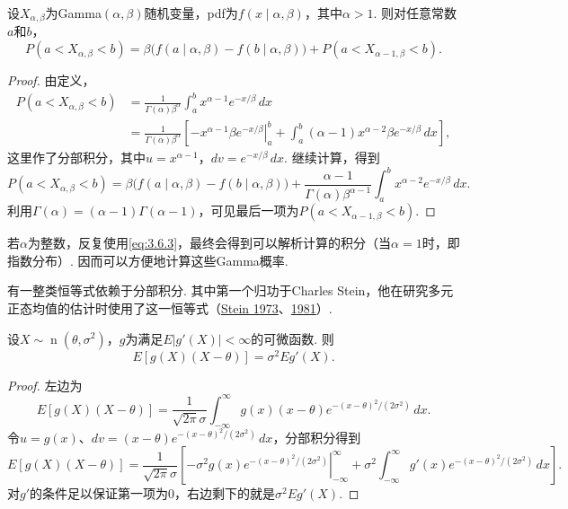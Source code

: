 \begin{theorem}\label{thm:3.6.4}
设$X_{\alpha,\beta}$为Gamma$(\alpha,\beta)$随机变量，pdf为$f(x\mid\alpha,\beta)$，其中$\alpha>1$. 则对任意常数$a$和$b$，
\begin{equation}\label{eq:3.6.3}
P(a<X_{\alpha,\beta}<b)=\beta\bigl(f(a\mid\alpha,\beta)-f(b\mid\alpha,\beta)\bigr)+P(a<X_{\alpha-1,\beta}<b).
\end{equation}
\end{theorem}
\begin{proof}
由定义，
\begin{align*}
P(a<X_{\alpha,\beta}<b)&=\frac1{\Gamma(\alpha)\beta^\alpha}\int_a^b x^{\alpha-1}e^{-x/\beta}\,dx\\
&=\frac1{\Gamma(\alpha)\beta^\alpha}\left[\left.-x^{\alpha-1}\beta e^{-x/\beta}\right|_a^b+\int_a^b(\alpha-1)x^{\alpha-2}\beta e^{-x/\beta}\,dx\right],
\end{align*}
这里作了分部积分，其中$u=x^{\alpha-1}$，$dv=e^{-x/\beta}\,dx$. 继续计算，得到
$$P(a<X_{\alpha,\beta}<b)=\beta\bigl(f(a\mid\alpha,\beta)-f(b\mid\alpha,\beta)\bigr)+\frac{\alpha-1}{\Gamma(\alpha)\beta^{\alpha-1}}\int_a^b x^{\alpha-2}e^{-x/\beta}\,dx.$$
利用$\Gamma(\alpha)=(\alpha-1)\Gamma(\alpha-1)$，可见最后一项为$P(a<X_{\alpha-1,\beta}<b)$.
\end{proof}
若$\alpha$为整数，反复使用\eqref{eq:3.6.3}，最终会得到可以解析计算的积分（当$\alpha=1$时，即指数分布）. 因而可以方便地计算这些Gamma概率.

有一整类恒等式依赖于分部积分. 其中第一个归功于Charles Stein，他在研究多元正态均值的估计时使用了这一恒等式（\hyperref[bib:source303]{Stein 1973}、\hyperref[bib:source304]{1981}）.

\begin{lemma}[Stein引理]\label{lem:3.6.5}
设$X\sim\operatorname n(\theta,\sigma^2)$，$g$为满足$E|g'(X)|<\infty$的可微函数. 则
$$E[g(X)(X-\theta)]=\sigma^2Eg'(X).$$
\end{lemma}
\begin{proof}
左边为
$$E[g(X)(X-\theta)]=\frac1{\sqrt{2\pi}\sigma}\int_{-\infty}^\infty g(x)(x-\theta)e^{-(x-\theta)^2/(2\sigma^2)}\,dx.$$
令$u=g(x)$、$dv=(x-\theta)e^{-(x-\theta)^2/(2\sigma^2)}\,dx$，分部积分得到
$$E[g(X)(X-\theta)]=\frac1{\sqrt{2\pi}\sigma}\left[\left.-\sigma^2g(x)e^{-(x-\theta)^2/(2\sigma^2)}\right|_{-\infty}^\infty+\sigma^2\int_{-\infty}^\infty g'(x)e^{-(x-\theta)^2/(2\sigma^2)}\,dx\right].$$
对$g'$的条件足以保证第一项为0，右边剩下的就是$\sigma^2Eg'(X)$.
\end{proof}

